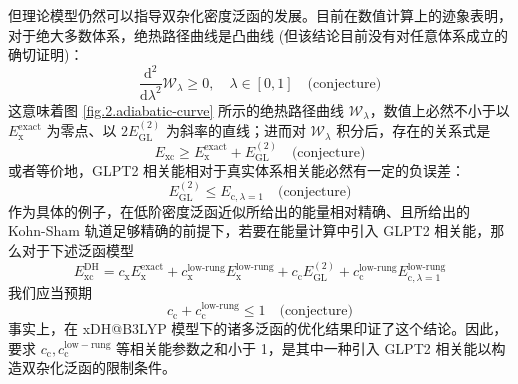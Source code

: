 但理论模型仍然可以指导双杂化密度泛函的发展。目前在数值计算上的迹象表明，对于绝大多数体系，绝热路径曲线是凸曲线\cite{Frydel-Burke.JCP.2000, Fuchs-Burke.JCP.2005, Teale-Helgaker.JCP.2009,Teale-Helgaker.JCP.2010, Carrascal-Burke.JPCM.2015} (但该结论目前没有对任意体系成立的确切证明\cite{Crisostomo-Burke.LMP.2023})：
\begin{equation}
  \frac{\mathrm{d}^2}{\mathrm{d} \lambda^2} \mathcal{W}_{\lambda} \geqslant 0, \quad \lambda \in [0, 1] \quad \text{(conjecture)}
\end{equation}
这意味着图 \ref{fig.2.adiabatic-curve} 所示的绝热路径曲线 $\mathcal{W}_\lambda$，数值上必然不小于以 $E_\mathrm{x}^\mathrm{exact}$ 为零点、以 $2 E_\mathrm{GL}^{(2)}$ 为斜率的直线；进而对 $\mathcal{W}_\lambda$ 积分后，存在的关系式是
\begin{equation}
  E_\mathrm{xc} \geqslant E_\mathrm{x}^\mathrm{exact} + E_\mathrm{GL}^{(2)} \quad \text{(conjecture)}
\end{equation}
或者等价地，GLPT2 相关能相对于真实体系相关能必然有一定的负误差：
\begin{equation}
  E_\mathrm{GL}^{(2)} \leqslant E_{\mathrm{c}, \lambda=1} \quad \text{(conjecture)}
\end{equation}
作为具体的例子，在低阶密度泛函近似所给出的能量相对精确、且所给出的 Kohn-Sham 轨道足够精确的前提下，若要在能量计算中引入 GLPT2 相关能，那么对于下述泛函模型
\begin{equation*}
  E_\mathrm{xc}^\mathrm{DH} = c_\mathrm{x} E_\mathrm{x}^\mathrm{exact} + c_\mathrm{x}^\text{low-rung} E_\mathrm{x}^\text{low-rung} + c_\mathrm{c} E_\mathrm{GL}^{(2)} + c_\mathrm{c}^\text{low-rung} E_{\mathrm{c}, \lambda=1}^\text{low-rung}
\end{equation*}
我们应当预期
\begin{equation*}
  c_\mathrm{c} + c_\mathrm{c}^\text{low-rung} \leqslant 1 \quad \text{(conjecture)}
\end{equation*}
事实上，在 xDH@B3LYP 模型下的诸多泛函的优化结果印证了这个结论\cite{Zhang-Xu.JPCL.2021}。因此，要求 $c_\mathrm{c}, c_\mathrm{c}^\mathrm{low-rung}$ 等相关能参数之和小于 1，是其中一种引入 GLPT2 相关能以构造双杂化泛函的限制条件。

